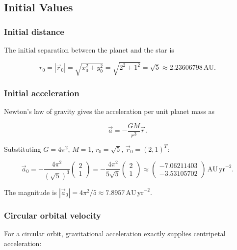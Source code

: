 \subsection{Initial Values}

\subsubsection*{Initial distance}

The initial separation between the planet and the star is

\begin{equation}
    r_0 = |\vec{r}_0| = \sqrt{x_0^2 + y_0^2} = \sqrt{2^2 + 1^2} = \sqrt{5} \approx 2.23606798\,\mathrm{AU}.
\end{equation}

\subsubsection*{Initial acceleration}

Newton's law of gravity gives the acceleration per unit planet mass as

\begin{equation}
    \vec{a} = -\frac{GM}{r^3}\vec{r}.
\end{equation}

Substituting $G = 4\pi^2$, $M = 1$, $r_0 = \sqrt{5}$, $\vec{r}_0 = (2,1)^T$:

\begin{equation}
    \vec{a}_0 = -\frac{4\pi^2}{(\sqrt{5})^3}\begin{pmatrix}2\\1\end{pmatrix}
    = -\frac{4\pi^2}{5\sqrt{5}}\begin{pmatrix}2\\1\end{pmatrix}
    \approx \begin{pmatrix}-7.06211403\\-3.53105702\end{pmatrix}\,\mathrm{AU\,yr}^{-2}.
\end{equation}

The magnitude is $|\vec{a}_0| = 4\pi^2/5 \approx 7.8957\,\mathrm{AU\,yr}^{-2}$.

\subsubsection*{Circular orbital velocity}

For a circular orbit, gravitational acceleration exactly supplies centripetal acceleration:

